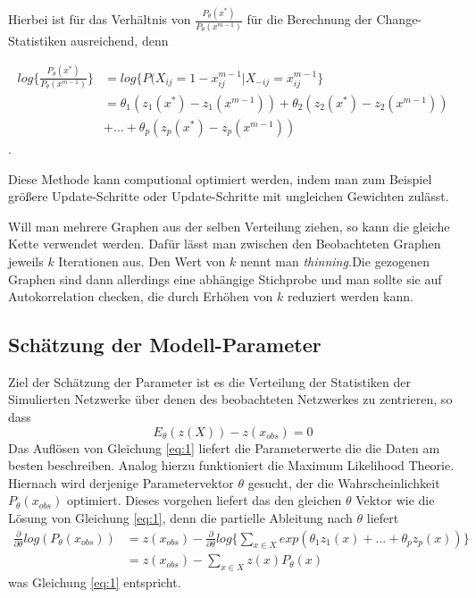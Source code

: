 \documentclass[a4paper,ngerman,oneside,titlepage,bibliography=totoc,11pt]{scrreprt}
\begin{document}
Hierbei ist für das Verhältnis von $\frac{P_{\theta}(x^*)}{P_{\theta}(x^{m-1})}$ für die Berechnung der Change-Statistiken ausreichend, denn

\begin{align*}
log\{\frac{P_{\theta}(x^*)}{P_{\theta}(x^{m-1})}\} &= log\{P(X_{ij} = 1-x_{ij}^{m-1}|X_{-ij}=x_{ij}^{m-1}\} \\
																										&= \theta_1(z_1(x^*) - z_1(x^{m-1})) + \theta_2(z_2(x^*) - z_2(x^{m-1}))\\   																									& + ... + \theta_p(z_p(x^*) - z_p(x^{m-1}))
\end{align*}.

Diese Methode kann computional optimiert werden, indem man zum Beispiel größere Update-Schritte oder Update-Schritte mit ungleichen Gewichten zulässt.

Will man mehrere Graphen aus der selben Verteilung ziehen, so kann die gleiche Kette verwendet werden. Dafür lässt man zwischen den Beobachteten Graphen jeweils $k$ Iterationen aus. Den Wert von $k$ nennt man \emph{thinning.}Die gezogenen Graphen sind dann allerdings eine abhängige Stichprobe und man sollte sie auf Autokorrelation checken, die durch Erhöhen von $k$ reduziert werden kann.

\subsection{Schätzung der Modell-Parameter}
Ziel der Schätzung der Parameter ist es die Verteilung der Statistiken der Simulierten Netzwerke über denen des beobachteten Netzwerkes zu zentrieren, so dass
\begin{equation}
	E_\theta(z(X)) - z(x_{obs}) = 0
	\label{eq:1}
\end{equation}
Das Auflösen von Gleichung \ref{eq:1} liefert die Parameterwerte die die Daten am besten beschreiben.
Analog hierzu funktioniert die Maximum Likelihood Theorie. Hiernach wird derjenige Parametervektor $\theta$ gesucht, der die Wahrscheinlichkeit $P_\theta(x_{obs})$ optimiert. Dieses vorgehen liefert das den gleichen $\theta$ Vektor wie die Lösung von Gleichung \ref{eq:1}, denn die partielle Ableitung nach $\theta$ liefert
\begin{align*}
\frac{\partial}{\partial \theta} log(P_\theta(x_{obs})) &= z(x_{obs}) - \frac{\partial}{\partial \theta} log\{\sum_{x \in X}{exp(\theta_1z_1(x)+ ... + \theta_pz_p(x))}\}\\
&=z(x_{obs}) - \sum_{x \in X}{z(x)P_\theta(x)}
\end{align*}
was Gleichung \ref{eq:1} entspricht.
\end{document}
